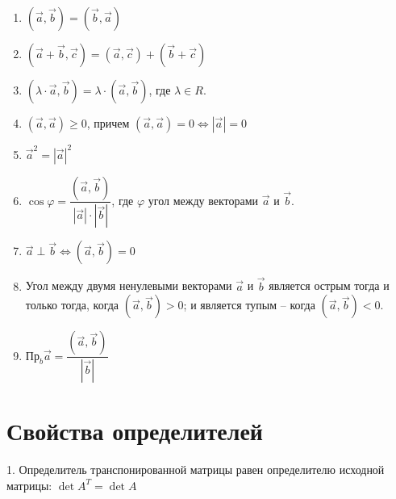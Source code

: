 \documentclass[12pt, fleqn]{extarticle}
\begin{document}
\begin{enumerate}[noitemsep]
    \item \((\overrightarrow{a}, \overrightarrow{b}) = (\overrightarrow{b}, \overrightarrow{a})\)

    \item \((\overrightarrow{a} + \overrightarrow{b}, \overrightarrow{c}) = (\overrightarrow{a}, \overrightarrow{c}) + (\overrightarrow{b} + \overrightarrow{c})\)

    \item \((\lambda \cdot \overrightarrow{a}, \overrightarrow{b}) = \lambda \cdot (\overrightarrow{a}, \overrightarrow{b})\), где \(\lambda \in R\).

    \item \((\overrightarrow{a}, \overrightarrow{a}) \geq 0\), причем \((\overrightarrow{a}, \overrightarrow{a}) = 0 \iff |\overrightarrow{a}| = 0\)

    \item \(\overrightarrow{a}^2 = |\overrightarrow{a}|^2\)

    \item \(\cos{\varphi} = \dfrac{(\overrightarrow{a}, \overrightarrow{b})}{|\overrightarrow{a}| \cdot |\overrightarrow{b}|}\), где \(\varphi\) угол между векторами \(\overrightarrow{a}\) и \(\overrightarrow{b}\).

    \item \(\overrightarrow{a} \perp \overrightarrow{b} \iff (\overrightarrow{a}, \overrightarrow{b}) = 0\)

    \item Угол между двумя ненулевыми векторами \(\overrightarrow{a}\) и \(\overrightarrow{b}\) является острым тогда и только тогда, когда \((\overrightarrow{a}, \overrightarrow{b}) > 0\); и является тупым – когда \((\overrightarrow{a}, \overrightarrow{b}) < 0\).

    \item \(\text{Пр}_{b}\overrightarrow{a} = \dfrac{(\overrightarrow{a}, \overrightarrow{b})}{|\overrightarrow{b}|}\)
\end{enumerate}


\newpage

\section{Свойства определителей}\label{sec:det}

1. Определитель транспонированной матрицы равен определителю исходной матрицы: \(\det A^T = \det A\)
\end{document}
